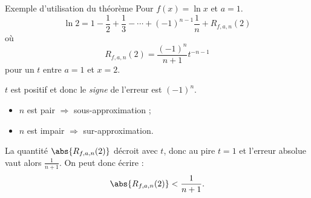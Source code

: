 
\begin{frame}{Exemple d'utilisation du théorème}
  Pour $f(x) = \ln x$ et $a = 1$.\pause{}
  \begin{equation*}
    \ln 2 = 1 - \frac{1}{2} + \frac{1}{3} - \cdots + (-1)^{n-1} \frac{1}{n} + R_{f,a,n}(2)
  \end{equation*}\pause{}
  où
  \begin{equation*}
    R_{f,a,n}(2) = \frac{(-1)^{n}}{n+1} t^{-n-1}
  \end{equation*}
  pour un $t$ entre $a = 1$ et $x = 2$.\pause{}

\begin{remark*}
  $t$ est positif et donc le \emph{signe} de l'erreur est $(-1)^n$.\pause{}
  \begin{itemize}
  \item \(n\) est pair \(\Longrightarrow\) sous-approximation ;\pause{}
  \item \(n\) est impair \(\Longrightarrow\) sur-approximation.
  \end{itemize}
\end{remark*}\pause{}

La quantité \(\abs{R_{f,a,n}(2)}\) décroit avec \(t\)\pause{}, donc au pire \(t = 1\)\pause{} et l'erreur absolue vaut alors \(\frac{1}{n+1}\).\pause{} On peut donc écrire :
\begin{equation*}
  \abs{R_{f,a,n}(2)} < \frac{1}{n+1}.
\end{equation*}
\end{frame}
